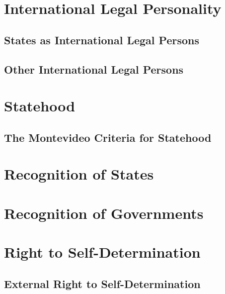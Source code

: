 \section{International Legal Personality}

\subsection{States as International Legal Persons}

\subsection{Other International Legal Persons}

\section{Statehood}

\subsection{The Montevideo Criteria for Statehood}

\section{Recognition of States}

\section{Recognition of Governments}

\section{Right to Self-Determination}

\subsection{External Right to Self-Determination}